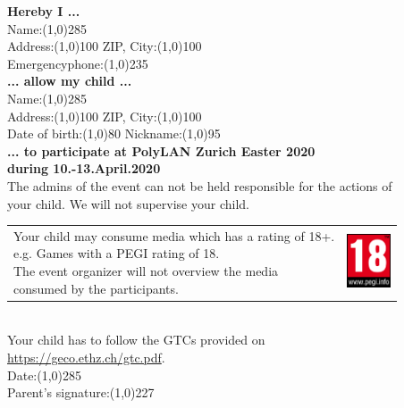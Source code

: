 \documentclass{article}
\begin{document}
\textbf{Hereby I ...}\\
\vspace{0.5cm}
Name:\line(1,0){285}\\
\vspace{0.5cm}
Address:\line(1,0){100}\hspace{1cm} ZIP, City:\line(1,0){100}\\
\vspace{0.5cm}
Emergencyphone:\line(1,0){235} \\
\vspace{0.5cm}
\textbf{... allow my child ...}\\
\vspace{0.5cm}
Name:\line(1,0){285}\\
\vspace{0.5cm}
Address:\line(1,0){100}\hspace{1cm} ZIP, City:\line(1,0){100}\\
\vspace{0.5cm}
Date of birth:\line(1,0){80}\hspace{1cm} Nickname:\line(1,0){95}\\
\vspace{0.5cm}
\textbf{... to participate at PolyLAN Zurich Easter 2020\\during 10.-13.April.2020}\\
\vspace{0.5cm}
The admins of the event can not be held responsible for the actions of\\your child.
We will not supervise your child.\\
\vspace{0.2cm}
\begin{tabular}{@{}l l@{}}
\shortstack[l]{Your child may consume media which has a rating of 18+. \\e.g. Games with a PEGI rating of 18.\\The event organizer will not overview the media\\ consumed by the participants.} & \includegraphics[width=1.3cm]{img/pegi18.png}
\end{tabular}
\vspace{0.5cm}
\\
Your child has to follow the GTCs provided on\\\url{https://geco.ethz.ch/gtc.pdf}.
\vspace{1cm}
\\
Date:\line(1,0){285} \\
\vspace{0.5cm}
Parent's signature:\line(1,0){227} \\

\end{document}
